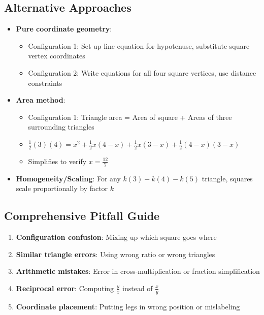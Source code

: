 \documentclass[]{article}
\begin{document}
\begin{solutionbox}
\subsection*{Alternative Approaches}
\begin{itemize}[leftmargin=*]
    \item \textbf{Pure coordinate geometry}: 
    \begin{itemize}
        \item Configuration 1: Set up line equation for hypotenuse, substitute square vertex coordinates
        \item Configuration 2: Write equations for all four square vertices, use distance constraints
    \end{itemize}
    \item \textbf{Area method}: 
    \begin{itemize}
        \item Configuration 1: Triangle area = Area of square + Areas of three surrounding triangles
        \item $\frac{1}{2}(3)(4) = x^2 + \frac{1}{2}x(4-x) + \frac{1}{2}x(3-x) + \frac{1}{2}(4-x)(3-x)$
        \item Simplifies to verify $x = \frac{12}{7}$
    \end{itemize}
    \item \textbf{Homogeneity/Scaling}: For any $k(3)-k(4)-k(5)$ triangle, squares scale proportionally by factor $k$
\end{itemize}

\subsection*{Comprehensive Pitfall Guide}
\begin{enumerate}[leftmargin=*]
    \item \textbf{Configuration confusion}: Mixing up which square goes where
    \item \textbf{Similar triangle errors}: Using wrong ratio or wrong triangles
    \item \textbf{Arithmetic mistakes}: Error in cross-multiplication or fraction simplification
    \item \textbf{Reciprocal error}: Computing $\frac{y}{x}$ instead of $\frac{x}{y}$
    \item \textbf{Coordinate placement}: Putting legs in wrong position or mislabeling
\end{enumerate}
\end{solutionbox}
\end{document}
